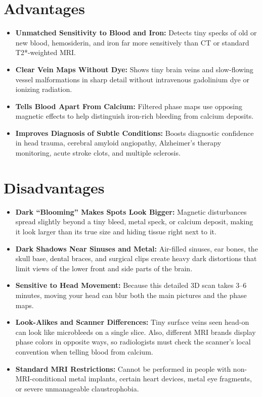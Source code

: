 \section{Advantages}

\begin{itemize}
    \item \textbf{Unmatched Sensitivity to Blood and Iron:} Detects tiny specks of old or new blood, hemosiderin, and iron far more sensitively than CT or standard T2*-weighted MRI.
    \item \textbf{Clear Vein Maps Without Dye:} Shows tiny brain veins and slow-flowing vessel malformations in sharp detail without intravenous gadolinium dye or ionizing radiation.
    \item \textbf{Tells Blood Apart From Calcium:} Filtered phase maps use opposing magnetic effects to help distinguish iron-rich bleeding from calcium deposits.
    \item \textbf{Improves Diagnosis of Subtle Conditions:} Boosts diagnostic confidence in head trauma, cerebral amyloid angiopathy, Alzheimer's therapy monitoring, acute stroke clots, and multiple sclerosis.
\end{itemize}

\section{Disadvantages}

\begin{itemize}
    \item \textbf{Dark ``Blooming'' Makes Spots Look Bigger:} Magnetic disturbances spread slightly beyond a tiny bleed, metal speck, or calcium deposit, making it look larger than its true size and hiding tissue right next to it.
    \item \textbf{Dark Shadows Near Sinuses and Metal:} Air-filled sinuses, ear bones, the skull base, dental braces, and surgical clips create heavy dark distortions that limit views of the lower front and side parts of the brain.
    \item \textbf{Sensitive to Head Movement:} Because this detailed 3D scan takes 3--6 minutes, moving your head can blur both the main pictures and the phase maps.
    \item \textbf{Look-Alikes and Scanner Differences:} Tiny surface veins seen head-on can look like microbleeds on a single slice. Also, different MRI brands display phase colors in opposite ways, so radiologists must check the scanner's local convention when telling blood from calcium.
    \item \textbf{Standard MRI Restrictions:} Cannot be performed in people with non-MRI-conditional metal implants, certain heart devices, metal eye fragments, or severe unmanageable claustrophobia.
\end{itemize}


